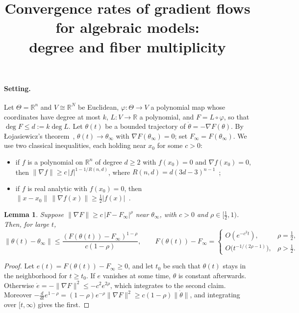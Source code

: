 \documentclass[11pt]{article}
\title{Convergence rates of gradient flows for algebraic models:\\ degree and fiber multiplicity}
\author{}
\date{}
\newtheorem{lemma}[theorem]{Lemma}
\theoremstyle{remark}
\newcommand{\R}{\mathbb{R}}
\begin{document}
\maketitle

\paragraph{Setting.}
Let $\Theta=\R^n$ and $V\cong\R^N$ be Euclidean, $\varphi\colon\Theta\to V$ a polynomial map whose coordinates have degree at most $k$, $L\colon V\to\R$ a polynomial, and $F=L\circ\varphi$, so that $\deg F\le d:=k\deg L$. Let $\theta(t)$ be a bounded trajectory of $\dot\theta=-\nabla F(\theta)$. By {\L}ojasiewicz's theorem~\cite{Loj84}, $\theta(t)\to\theta_\infty$ with $\nabla F(\theta_\infty)=0$; set $F_\infty=F(\theta_\infty)$. We use two classical inequalities, each holding near $x_0$ for some $c>0$:
\begin{itemize}
\item[(DK)] if $f$ is a polynomial on $\R^n$ of degree $d\ge2$ with $f(x_0)=0$ and $\nabla f(x_0)=0$, then $\|\nabla f\|\ge c\,|f|^{1-1/R(n,d)}$, where $R(n,d)=d(3d-3)^{n-1}$~\cite{DK05};
\item[(BL)] if $f$ is real analytic with $f(x_0)=0$, then $\|x-x_0\|\,\|\nabla f(x)\|\ge\tfrac12|f(x)|$~\cite{BL71}.
\end{itemize}

\begin{lemma}\label{lem:rates}
Suppose $\|\nabla F\|\ge c\,|F-F_\infty|^{\rho}$ near $\theta_\infty$, with $c>0$ and $\rho\in[\frac12,1)$. Then, for large $t$,
\[
\|\theta(t)-\theta_\infty\|\le\frac{(F(\theta(t))-F_\infty)^{1-\rho}}{c(1-\rho)},
\qquad
F(\theta(t))-F_\infty=
\begin{cases}
O(e^{-c^2t}), & \rho=\frac12,\\[2pt]
O\big(t^{-1/(2\rho-1)}\big), & \rho>\frac12.
\end{cases}
\]
\end{lemma}

\begin{proof}
Let $e(t)=F(\theta(t))-F_\infty\ge0$, and let $t_0$ be such that $\theta(t)$ stays in the neighborhood for $t\ge t_0$. If $e$ vanishes at some time, $\theta$ is constant afterwards. Otherwise $\dot e=-\|\nabla F\|^2\le-c^2e^{2\rho}$, which integrates to the second claim. Moreover $-\frac{d}{dt}e^{1-\rho}=(1-\rho)e^{-\rho}\|\nabla F\|^2\ge c(1-\rho)\|\dot\theta\|$, and integrating over $[t,\infty)$ gives the first.
\end{proof}
\end{document}
